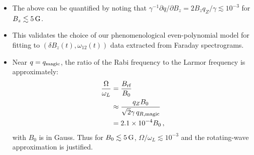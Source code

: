 \documentclass[aps,prl,reprint,superscriptaddress,floatfix]{revtex4-1}
\begin{document}
\begin{itemize}
    \item[\checkmark] The above can be quantified by noting that $\gamma^{-1} \partial q / \partial B_z = 2 B_z q_Z / \gamma \lesssim 10^{-3}$ for $B_z \lesssim \unit[5]{G}$.
    \item This validates the choice of our phenomenological even-polynomial model for fitting to $(\delta B_z(t), \omega_{12}(t))$ data extracted from Faraday spectrograms.
    \item Near $q = q_{\text{magic}}$, the ratio of the Rabi frequency to the Larmor frequency is approximately:
    \begin{align*}
        \frac{\Omega}{\omega_L} &= \frac{B_\text{rf}}{B_0} \\
                                &\approx \frac{q_Z B_0}{\sqrt{2} \gamma \, q_{R,\text{magic}}} \\
                                &= 2.1\times10^{-4} B_0 \, ,
    \end{align*}
    with $B_0$ is in Gauss.
    Thus for $B_0 \lesssim \unit[5]{G}$, $\Omega/\omega_L \lesssim 10^{-3}$ and the rotating-wave approximation is justified.
\end{itemize} 
\end{document}
